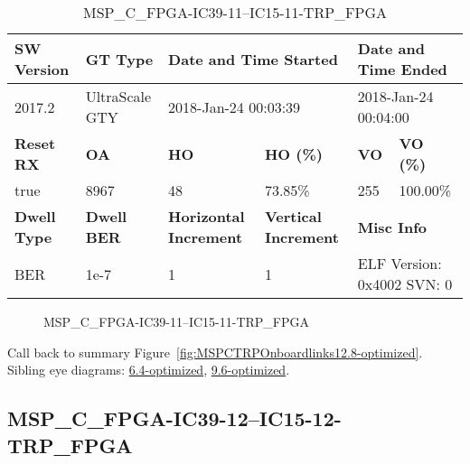\begin{table}[h]
\centering
\caption{MSP\_C\_FPGA-IC39-11--IC15-11-TRP\_FPGA}
\label{tab:MSPCFPGAIC3911IC1511TRPFPGA12.8-optimized}
\begin{tabular}{@{}|l|l|l|l|l|l|@{}}
\toprule
\textbf{SW Version}                & \textbf{GT Type}   & \multicolumn{2}{l|}{\textbf{Date and Time Started}}            & \multicolumn{2}{l|}{\textbf{Date and Time Ended}}        \\ \midrule
2017.2                       & UltraScale GTY          & \multicolumn{2}{l|}{2018-Jan-24 00:03:39}                   & \multicolumn{2}{l|}{2018-Jan-24 00:04:00}               \\ \midrule
\textbf{Reset RX}                  & \textbf{OA} & \textbf{HO}   & \textbf{HO (\%)} & \textbf{VO} & \textbf{VO (\%)} \\ \midrule
true & 8967        & 48          & 73.85\%        & 255        & 100.00\%       \\ \midrule
\textbf{Dwell Type}                & \textbf{Dwell BER} & \textbf{Horizontal Increment} & \textbf{Vertical Increment}    & \multicolumn{2}{l|}{\textbf{Misc Info}}                  \\ \midrule
BER                            & 1e-7        & 1        & 1           & \multicolumn{2}{l|}{ELF Version: 0x4002 SVN: 0}                         \\ \bottomrule
\end{tabular}
\end{table}

\begin{figure}[h]
\caption{MSP\_C\_FPGA-IC39-11--IC15-11-TRP\_FPGA} \label{fig:MSPCFPGAIC3911IC1511TRPFPGA12.8-optimized}
\end{figure}

Call back to summary Figure~\ref{fig:MSPCTRPOnboardlinks12.8-optimized}.
Sibling eye diagrams: \hyperref[sec:MSPCFPGAIC3911IC1511TRPFPGA6.4-optimized]{6.4-optimized}, \hyperref[sec:MSPCFPGAIC3911IC1511TRPFPGA9.6-optimized]{9.6-optimized}.

\clearpage
\newpage


\subsection{MSP\_C\_FPGA-IC39-12--IC15-12-TRP\_FPGA}\label{sec:MSPCFPGAIC3912IC1512TRPFPGA12.8-optimized}

